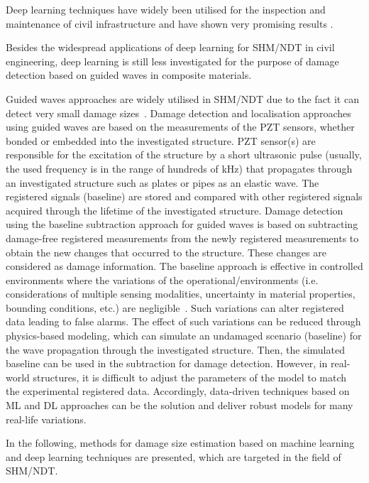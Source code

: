 Deep learning techniques have widely been utilised for the inspection and maintenance of civil infrastructure and have shown very promising results \cite{Cha2017b, Lin2017, liu2019computer, Beckman2019, Choi2020, Sonski2020a, Sonski2020, Sonski2019}. 

Besides the widespread applications of deep learning for SHM/NDT in civil engineering, deep learning is still less investigated for the purpose of damage detection based on guided waves in composite materials.

Guided waves approaches are widely utilised in SHM/NDT due to the fact it can detect very small damage sizes~\cite{Guemes2020}. 
Damage detection and localisation approaches using guided waves are based on the measurements of the PZT sensors, whether bonded or embedded into the investigated structure. 
PZT sensor(s) are responsible for the excitation of the structure by a short ultrasonic pulse (usually, the used frequency is in the range of hundreds of kHz) that propagates through an investigated structure such as plates or pipes as an elastic wave.
The registered signals (baseline) are stored and compared with other registered signals acquired through the lifetime of the investigated structure.
Damage detection using the baseline subtraction approach for guided waves is based on subtracting damage-free registered measurements from the newly registered measurements to obtain the new changes that occurred to the structure.
These changes are considered as damage information.
The baseline approach is effective in controlled environments where the variations of the operational/environments (i.e. considerations of multiple sensing modalities, uncertainty in material properties, bounding conditions, etc.) are negligible~\cite{Yuan2020}.  
Such variations can alter registered data leading to false alarms.
The effect of such variations can be reduced through physics-based modeling, which can simulate an undamaged scenario (baseline) for the wave propagation through the investigated structure.
Then, the simulated baseline can be used in the subtraction for damage detection.
However, in real-world structures, it is difficult to adjust the parameters of the model to match the experimental registered data.
Accordingly, data-driven techniques based on ML and DL approaches can be the solution and deliver robust models for many real-life variations.

In the following, methods for damage size estimation based on machine learning and deep learning techniques are presented, which are targeted in the field of SHM/NDT.

